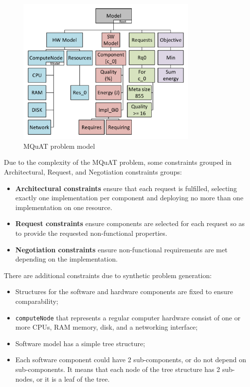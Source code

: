 \begin{figure}
	\centering
	\includegraphics[width=0.8\textwidth]{images/MQuATModel.pdf}
	\caption[MQuAT problem model]{MQuAT problem model}
	\label{fig:mquatmodel}
\end{figure}


Due to the complexity of the MQuAT problem, some constraints grouped in Architectural, Request, and Negotiation constraints groups:

\begin{itemize}
	\item \textbf{Architectural constraints} ensure that each request is fulfilled, selecting exactly one implementation per component and deploying no more than one implementation on one resource.
	\item \textbf{Request constraints} ensure components are selected for each request so as to provide the requested non-functional properties.
	\item \textbf{Negotiation constraints} ensure non-functional requirements are met depending on the implementation.
\end{itemize}

There are additional constraints due to synthetic problem generation:

\begin{itemize}
	\item Structures for the software and hardware components are fixed to ensure comparability;
	\item \texttt{computeNode} that represents a regular computer hardware consist of one or more CPUs, RAM memory, disk, and a networking interface;
	\item Software model has a simple tree structure;
	\item Each software component could have 2 sub-components, or do not depend on sub-components. It means that each node of the tree structure has 2 sub-nodes, or it is a leaf of the tree.
\end{itemize}


